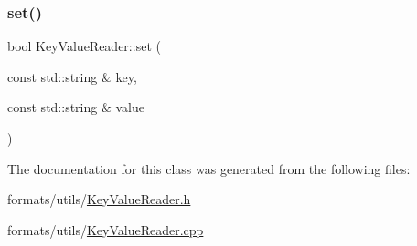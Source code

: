 \mbox{\label{classdisplace_1_1formats_1_1helpers_1_1_key_value_reader_a962e698ee19e27561b976091adb246d6}} 
\subsubsection{\texorpdfstring{set()}{set()}}
{\footnotesize\ttfamily bool Key\+Value\+Reader\+::set (\begin{DoxyParamCaption}\item[{const std\+::string \&}]{key,  }\item[{const std\+::string \&}]{value }\end{DoxyParamCaption})}



The documentation for this class was generated from the following files\+:\begin{DoxyCompactItemize}
\item 
formats/utils/\mbox{\hyperlink{_key_value_reader_8h}{Key\+Value\+Reader.\+h}}\item 
formats/utils/\mbox{\hyperlink{_key_value_reader_8cpp}{Key\+Value\+Reader.\+cpp}}\end{DoxyCompactItemize}
